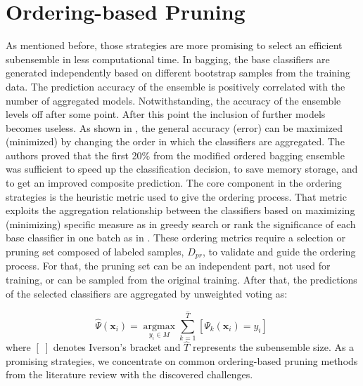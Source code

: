 \section{Ordering-based Pruning} \label{ch5_ordering_pruning}

As mentioned before, those strategies are more promising to select an efficient subensemble in less computational time. In bagging, the base classifiers are generated independently based on different bootstrap samples from the training data. The prediction accuracy of the ensemble is positively correlated with the number of aggregated models. Notwithstanding, the accuracy of the ensemble levels off after some point. After this point the inclusion of further models becomes useless. As shown in \cite{martinez2004,martinez2009}, the general accuracy (error) can be maximized (minimized) by changing the order in which the classifiers are aggregated. The authors proved that the first 20\% from the modified ordered bagging ensemble was sufficient to speed up the classification decision, to save memory storage, and to get an improved composite prediction. The core component in the ordering strategies is the heuristic metric used to give the ordering process. That metric exploits the aggregation relationship between the classifiers based on maximizing (minimizing) specific measure as in greedy search \cite{cao2018,martinez2004,margineantu1997} or rank the significance of each base classifier in one batch as in \cite{guo2013,guo2018,lu2010}. These ordering metrics require a selection or pruning set composed of labeled samples, $D_{pr}$, to validate and guide the ordering process. For that, the pruning set can be an independent part, not used for training, or can be sampled from the original training. After that, the predictions of the selected classifiers are aggregated by unweighted voting as: 

\begin{equation}
\label{consensus}
\hat{\Psi}(\textbf{x}_i)=\mathop{\arg\max}\limits_{y_i \in {M}} \mathop{\sum}\limits_{k=1}^{\hat{T}} \left[\Psi_{k}(\textbf{x}_i)=y_i\right] \; 
\end{equation}
where $[\;]$ denotes Iverson's bracket and $\hat{T}$ represents the subensemble size. As a promising strategies, we concentrate on common ordering-based pruning methods from the literature review with the discovered challenges. 





